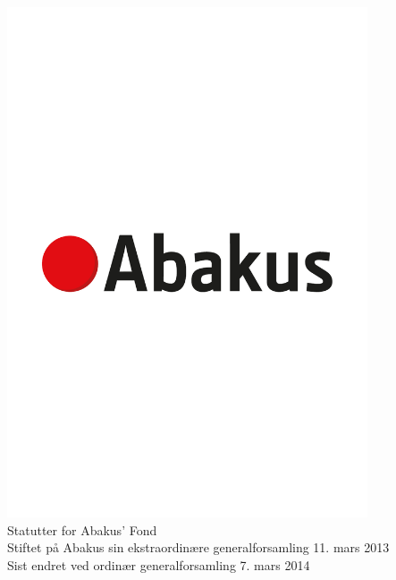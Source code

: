 \documentclass{article}
\begin{document}
\begin{center}
  \includegraphics[width=0.8\textwidth, trim=0 300 0 100, clip]{abakus_logo.eps} \\
  \Large{Statutter for Abakus' Fond} \\
  \vspace{0.4cm}
  \normalsize{Stiftet på Abakus sin ekstraordinære generalforsamling 11. mars 2013 \\
              Sist endret ved ordinær generalforsamling 7. mars 2014}
\end{center}

\newpage
\tableofcontents
\newpage


\end{document}
